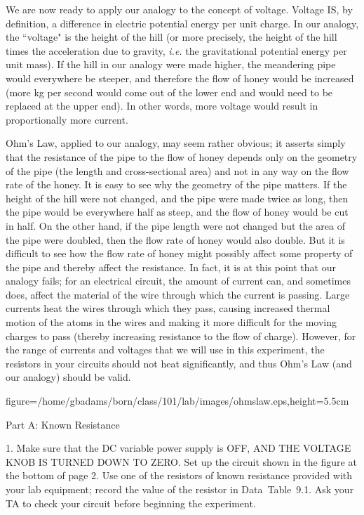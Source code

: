   We are now ready to apply our analogy to the concept
of voltage.  Voltage IS, by definition, a difference in 
electric potential energy per unit charge.  In our analogy, 
the ``voltage" is the height of the hill (or more precisely, 
the height of the hill times the acceleration due to gravity,
{\it i.e.} the gravitational potential energy per unit mass).  
If the hill in our analogy were made higher, the meandering 
pipe would everywhere be steeper, and therefore the flow of 
honey would be increased (more kg per second would come out 
of the lower end and would need to be replaced at the upper 
end).  In other words, more voltage would result in 
proportionally more current.

   Ohm's Law, applied to our analogy, may seem rather obvious;
it asserts simply that the resistance of the pipe to the flow 
of honey depends only on the geometry of the pipe (the length 
and cross-sectional area) and not in any way on the flow rate 
of the honey.  It is easy to see why the geometry of the pipe
matters.  If the height of the hill were not changed, and the 
pipe were made twice as long, then the pipe would be everywhere 
half as steep, and the flow of honey would be cut in half.  On 
the other hand, if the pipe length were not changed but the 
area of the pipe were doubled, then the flow rate of honey 
would also double.  But it is difficult to see how the flow 
rate of honey might possibly affect some property of the pipe 
and thereby affect the resistance.  In fact, it is at this 
point that our analogy fails; for an electrical circuit, the 
amount of current can, and sometimes does, affect the material 
of the wire through which the current is passing.  Large 
currents heat the wires through which they pass, causing 
increased thermal motion of the atoms in the wires and making 
it more difficult for the moving charges to pass (thereby 
increasing resistance to the flow of charge).  However, for 
the range of currents and voltages that we will use in this 
experiment, the resistors in your circuits should not heat 
significantly, and thus Ohm's Law (and our analogy) 
should be valid.

\bigskip
\centerline{\psfig
{figure=/home/gbadams/born/class/101/lab/images/ohmslaw.eps,height=5.5cm}}
\vfil\eject
{}

\centerline{Part A: Known Resistance}
\smallskip
\item{1.} Make sure that the DC variable power supply is 
OFF, AND THE VOLTAGE KNOB IS TURNED DOWN TO ZERO.  Set up 
the circuit shown in the figure at the bottom of page 2.  
Use one of the resistors of known resistance provided 
with your lab equipment; record the value of the resistor 
in Data~Table~9.1.  Ask your TA to check your circuit 
before beginning the experiment.  

